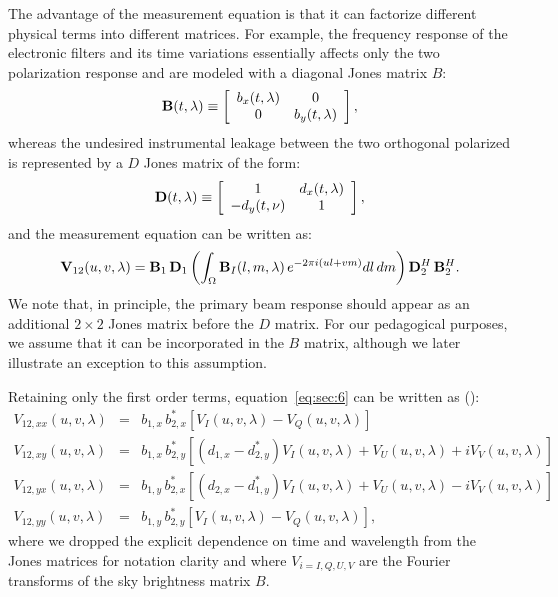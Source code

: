The advantage of the measurement equation is that it can factorize different physical terms into different matrices. For example, the frequency response of the electronic filters and its time variations essentially affects only the two polarization response and are modeled with a diagonal Jones matrix $B$:
\begin{equation}
    {\bf B} (t,\lambda) \equiv 
    \left[
    \begin{array}{cc}
    b_x (t,\lambda) 	& 	0 	\\
    0 		& b_y (t,\lambda) 	\\
    \end{array}
    \right],   
\label{eq:sec:4}
\end{equation} 
whereas the undesired instrumental leakage between the two orthogonal polarized is represented by a $D$ Jones matrix of the form:
\begin{equation}
    {\bf D} (t,\lambda) \equiv 
    \left[
    \begin{array}{cc}
    1	 		& d_x (t,\lambda)	\\
    -d_y (t,\nu)	& 1 	\\
    \end{array}
    \right],   
\label{eq:sec:5}
\end{equation} 
and the measurement equation can be written as:
\begin{equation}
{\bf V}_{12} (u,v,\lambda) = {\bf B}_1 \, {\bf D}_1 \left( \int_\Omega {\bf B}_I (l, m, \lambda) \, e^{-2 \pi i (ul + vm)} dl \, dm  \right) {\bf D}_2^H  \, {\bf B}_2^H.
\label{eq:sec:6}
\end{equation}
We note that, in principle, the primary beam response should appear as an additional $2 \times 2$ Jones matrix before the $D$ matrix. For our pedagogical purposes, we assume that it can be incorporated in the $B$ matrix, although we later illustrate an exception to this assumption.

Retaining only the first order terms, equation~\ref{eq:sec:6} can be written as (\cite{sault96}):
\begin{eqnarray}
V_{12,xx} (u,v,\lambda) & = & b_{1,x} \, b_{2,x}^* [V_I (u,v,\lambda) - V_Q (u,v,\lambda)]\\
V_{12,xy} (u,v,\lambda) & = & b_{1,x} \, b_{2,y}^* [(d_{1,x} - d_{2,y}^*) V_I (u,v,\lambda) + V_U (u,v,\lambda) + iV_V (u,v,\lambda)]	\\
V_{12,yx} (u,v,\lambda) & = & b_{1,y} \, b_{2,x}^* [(d_{2,x} - d_{1,y}^*) V_I (u,v,\lambda) + V_U (u,v,\lambda) - iV_V (u,v,\lambda)]	\\
V_{12,yy} (u,v,\lambda) & = & b_{1,y} \, b_{2,y}^* [V_I (u,v,\lambda) - V_Q (u,v,\lambda)],
\label{eq:sec:7}
\end{eqnarray}
where we dropped the explicit dependence on time and wavelength from the Jones matrices for notation clarity and where $V_{i=I, Q, U, V}$ are the Fourier transforms of the sky brightness matrix $B$.

